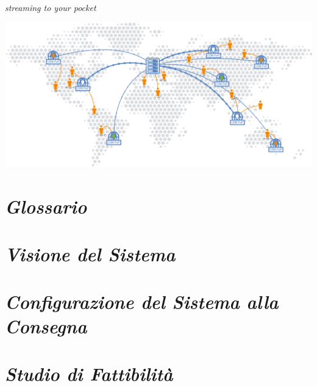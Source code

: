 \documentclass{article}
\author{Agosta, Belli, Emili, Giacchini, Luciani}
\begin{document}
\begin{center}
    \sffamily{\fontsize{50}{48} \selectfont \textcolor{red}{Nexi}\textcolor{green}{Fy}}
\end{center}

\begin{center}
    \itshape{\fontsize{20}{48} \selectfont streaming to your pocket}
\end{center}

\bigskip\bigskip\bigskip

\begin{flushleft}
    \includegraphics[scale=1]{images/worldCDN.png}
\end{flushleft}

\newpage
\printindex

\tableofcontents

\newpage
\section{\itshape{Glossario}}


\newpage
\section{\itshape{Visione del Sistema}}



\section{\itshape{Configurazione del Sistema alla Consegna}}


\section{\itshape{Studio di Fattibilità}}

\end{document}
